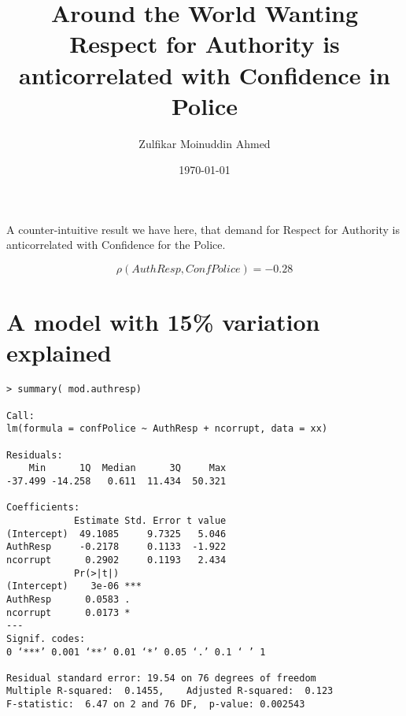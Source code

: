 \documentclass{amsart}
\title{Around the World Wanting Respect for Authority is anticorrelated with Confidence in Police}
\author{Zulfikar Moinuddin Ahmed}
\date{\today}
\begin{document}
\maketitle

A counter-intuitive result we have here, that demand for Respect for Authority is anticorrelated with Confidence for the Police.

\[
\rho(AuthResp, ConfPolice) = -0.28
\]

\section{A model with 15\% variation explained}

\begin{verbatim}
> summary( mod.authresp)

Call:
lm(formula = confPolice ~ AuthResp + ncorrupt, data = xx)

Residuals:
    Min      1Q  Median      3Q     Max 
-37.499 -14.258   0.611  11.434  50.321 

Coefficients:
            Estimate Std. Error t value
(Intercept)  49.1085     9.7325   5.046
AuthResp     -0.2178     0.1133  -1.922
ncorrupt      0.2902     0.1193   2.434
            Pr(>|t|)    
(Intercept)    3e-06 ***
AuthResp      0.0583 .  
ncorrupt      0.0173 *  
---
Signif. codes:  
0 ‘***’ 0.001 ‘**’ 0.01 ‘*’ 0.05 ‘.’ 0.1 ‘ ’ 1

Residual standard error: 19.54 on 76 degrees of freedom
Multiple R-squared:  0.1455,	Adjusted R-squared:  0.123 
F-statistic:  6.47 on 2 and 76 DF,  p-value: 0.002543
\end{verbatim}
\end{document}

